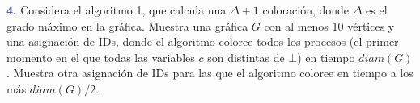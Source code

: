 \newpage
\textbf{\textcolor{MidnightBlue}{4.}} Considera el algoritmo 1,
que calcula una $\Delta + 1$ coloración, donde $\Delta$ es el
grado máximo en la gráfica. Muestra una gráfica $G$ con al menos
10 vértices y una asignación de IDs, donde el algoritmo coloree
todos los procesos (el primer momento en el que todas las variables
$c$ son distintas de $\bot$) en tiempo $diam(G)$. Muestra otra
asignación de IDs para las que el algoritmo coloree en tiempo a los
más $diam(G)/2$.
